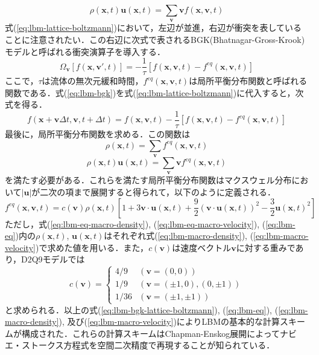 \begin{equation}
  \rho(\bm{x}, t) \bm{u}(\bm{x}, t) = \sum_{\bm{v}} \bm{v} f(\bm{x}, \bm{v}, t)
  \label{eq:lbm-macro-velocity}
\end{equation}
式(\ref{eq:lbm-lattice-boltzmann})において，左辺が並進，右辺が衝突を表していることに注意されたい．この右辺に次式で表されるBGK(Bhatnagar-Gross-Krook)モデルと呼ばれる衝突演算子\cite{todo}を導入する．
\begin{equation}
  \Omega_{\bm{v}}\left[ f(\bm{x}, \bm{v}', t) \right] = -\frac{1}{\tau} \left[ f(\bm{x}, \bm{v}, t) - f^{eq}(\bm{x}, \bm{v}, t) \right]
  \label{eq:lbm-bgk}
\end{equation}
ここで，$\tau$は流体の無次元緩和時間，$f^{eq}(\bm{x}, \bm{v}, t)$は局所平衡分布関数と呼ばれる関数である．式(\ref{eq:lbm-bgk})を式(\ref{eq:lbm-lattice-boltzmann})に代入すると，次式を得る．
\begin{equation}
  f(\bm{x}+\bm{v}\Delta t, \bm{v}, t+\Delta t) = f(\bm{x}, \bm{v}, t) - \frac{1}{\tau} \left[ f(\bm{x}, \bm{v}, t) - f^{eq}(\bm{x}, \bm{v}, t) \right]
  \label{eq:lbm-bgk-lattice-boltzmann}
\end{equation}
最後に，局所平衡分布関数を求める．この関数は
\begin{equation}
  \rho(\bm{x}, t) = \sum_{\bm{v}} f^{eq}(\bm{x}, \bm{v}, t)
  \label{eq:lbm-eq-macro-density}
\end{equation}
\begin{equation}
  \rho(\bm{x}, t) \bm{u}(\bm{x}, t) = \sum_{\bm{v}} \bm{v} f^{eq}(\bm{x}, \bm{v}, t)
  \label{eq:lbm-eq-macro-velocity}
\end{equation}
を満たす必要がある．これらを満たす局所平衡分布関数はマクスウェル分布\cite{todo}において$|\bm{u}|$が二次の項まで展開すると得られて，以下のように定義される．
\begin{equation}
  f^{eq}(\bm{x}, \bm{v}, t) = c(\bm{v}) \rho(\bm{x}, t) \left[ 1 + 3\bm{v} \cdot \bm{u}(\bm{x}, t) + \frac{9}{2}(\bm{v} \cdot \bm{u}(\bm{x}, t))^2 - \frac{3}{2}\bm{u}(\bm{x}, t)^2 \right]
  \label{eq:lbm-eq}
\end{equation}
ただし，式(\ref{eq:lbm-eq-macro-density}), (\ref{eq:lbm-eq-macro-velocity}), (\ref{eq:lbm-eq})内の$\rho(\bm{x}, t)$, $\bm{u}(\bm{x}, t)$はそれぞれ式(\ref{eq:lbm-macro-density}), (\ref{eq:lbm-macro-velocity})で求めた値を用いる．また，$c(\bm{v})$は速度ベクトル$\bm{v}$に対する重みであり，D2Q9モデルでは
\begin{equation}
  c(\bm{v}) = \left\{
    \begin{array}{ll}
      4/9 & (\bm{v} = (0, 0)) \\
      1/9 & (\bm{v} = (\pm 1, 0), (0, \pm 1)) \\
      1/36 & (\bm{v} = (\pm 1, \pm 1))
    \end{array}
  \right.
  \label{eq:lbm-weight}
\end{equation}
と求められる．以上の式(\ref{eq:lbm-bgk-lattice-boltzmann}), (\ref{eq:lbm-eq}), (\ref{eq:lbm-macro-density}), 及び(\ref{eq:lbm-macro-velocity})によりLBMの基本的な計算スキームが構成された．これらの計算スキームはChapman-Enskog展開によってナビエ・ストークス方程式を空間二次精度で再現することが知られている\cite{todo}．

